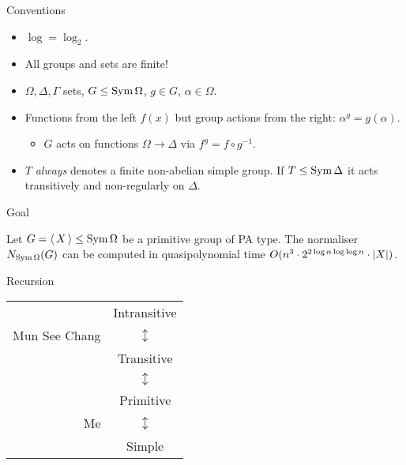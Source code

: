 \begin{frame}{Conventions}
\begin{itemize}
\setlength\itemsep{\fill}
\item
$\log = \log_2$.
\item
All groups and sets are finite!
\item
$\Omega, \Delta, \Gamma$ sets,
$G \leq \operatorname{Sym} \Omega$, $g \in G$, $\alpha \in \Omega$.
\item
Functions from the left $f(x)$
but group actions from the right: $\alpha ^ g = g(\alpha)$.
    \begin{itemize}
        \item
        $G$ acts on functions $\Omega \to \Delta$ via
        $f ^ g = f \circ g ^ {-1}$.
    \end{itemize}
\item
$T$ \emph{always} denotes a finite non-abelian simple group.
If $T \leq \operatorname{Sym} \Delta$ it acts transitively and non-regularly on $\Delta$.
\end{itemize}
\end{frame}

\begin{frame}{Goal}
    \begin{thm}
        Let $G =  \left\langle \, X \, \right\rangle  \leq \operatorname{Sym} \Omega$ be a primitive group
        of PA type.
        The normaliser
        $N_{\operatorname{Sym} \Omega}(G)$
        can be computed in quasipolynomial time
        $O(n ^ 3 \cdot 2 ^ {2 \log n \log \log n} \cdot  \left| X \right| )$.
    \end{thm}
\end{frame}

\begin{frame}{Recursion}
    \begin{center}
        \hspace{-5em}
        \begin{tabular}{r c}
            & Intransitive
            \\
            Mun See Chang & $\updownarrow$
            \\
            & Transitive
            \\
            & $\updownarrow$
            \\
            & Primitive
            \\
            Me & $\updownarrow$
            \\
            & Simple
        \end{tabular}
    \end{center}
\end{frame}
